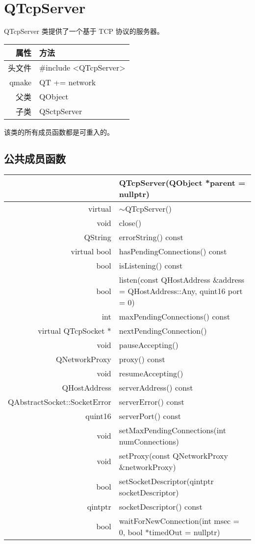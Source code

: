 \chapter{QTcpServer}

QTcpServer 类提供了一个基于 TCP 协议的服务器。

\begin{tabular}{|r|l|}
	\hline
	属性 & 方法 \\
	\hline
	头文件 & \#include <QTcpServer>\\      
	\hline
	qmake & QT += network\\      
	\hline
	父类	  & QObject \\ 
	\hline
    子类	 & QSctpServer \\ 
	\hline
\end{tabular}


\begin{notice}
该类的所有成员函数都是可重入的。
\end{notice}

\section{公共成员函数}

\begin{longtable}{|r|l|}
	\hline
		& QTcpServer(QObject *parent = nullptr) \\
	\hline
	 virtual	& $\sim$QTcpServer() \\ 
	\hline
void	 & close() \\ 
\hline
QString	& errorString() const \\
\hline
virtual bool	& hasPendingConnections() const \\ 
\hline
bool	& isListening() const \\ 
\hline
bool	& listen(const QHostAddress \&address = QHostAddress::Any, quint16 port = 0) \\ 
\hline
int	& maxPendingConnections() const \\
\hline
virtual QTcpSocket *	& nextPendingConnection()\\
\hline
void	 & pauseAccepting() \\ 
\hline
QNetworkProxy	& proxy() const\\
\hline
void	 & resumeAccepting()\\
\hline
QHostAddress & 	serverAddress() const\\
\hline
QAbstractSocket::SocketError	 & serverError() const \\
\hline
quint16	 & serverPort() const\\
\hline
void	 & setMaxPendingConnections(int numConnections)\\
\hline
void	 & setProxy(const QNetworkProxy \&networkProxy)\\
\hline
bool	& setSocketDescriptor(qintptr socketDescriptor)\\
\hline
qintptr	& socketDescriptor() const\\
\hline
bool	& waitForNewConnection(int msec = 0, bool *timedOut = nullptr)\\
	\hline
\end{longtable}

